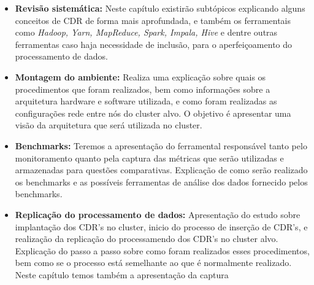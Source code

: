     \begin{itemize}
        \item \textbf{Revisão sistemática:} Neste capítulo existirão subtópicos explicando alguns conceitos de CDR de forma mais
                                                                    aprofundada, e também os ferramentais como \textit{Hadoop, Yarn, MapReduce, Spark,
                                                                    Impala, Hive} e dentre outras ferramentas caso haja necessidade de inclusão, para o
                                                                    aperfeiçoamento do processamento de dados.
        \item \textbf{Montagem do ambiente:} Realiza uma explicação sobre quais os procedimentos que foram realizados,
                                                                         bem como informações sobre a arquitetura hardware e software utilizada, e
                                                                         como foram realizadas as configurações rede entre nós do cluster alvo. O
                                                                         objetivo é apresentar uma visão da arquitetura que será utilizada no cluster.
        \item \textbf{Benchmarks:} Teremos a apresentação do ferramental responsável tanto pelo monitoramento quanto
                                                       pela captura das métricas que serão utilizadas e armazenadas para questões comparativas.
                                                       Explicação de como serão realizado os benchmarks e as possíveis ferramentas de análise
                                                       dos dados fornecido pelos benchmarks.
        \item \textbf{Replicação do processamento de dados:} Apresentação do estudo sobre implantação dos CDR's no cluster,
                                                                                                   inicio do processo de inserção de CDR's, e realização da replicação
                                                                                                   do processamendo dos CDR's no cluster alvo. Explicação do passo
                                                                                                   a passo sobre como foram realizados esses procedimentos, bem
                                                                                                   como se o processo está semelhante ao que é normalmente
                                                                                                   realizado. Neste capítulo temos também a apresentação da captura

\end{itemize}
